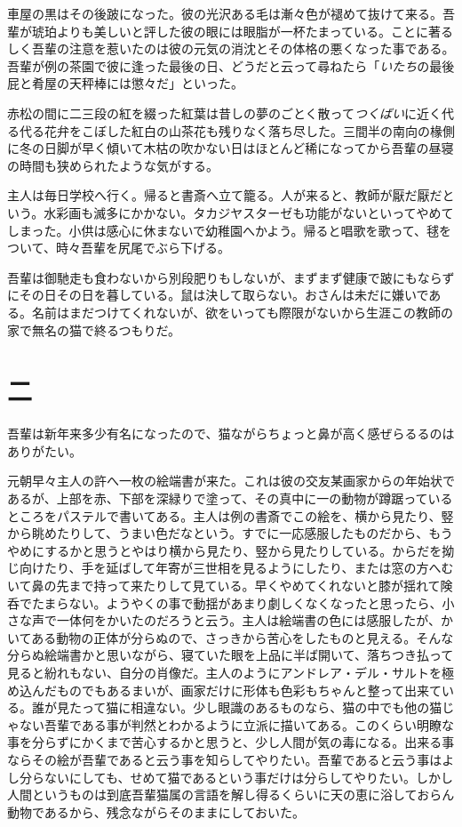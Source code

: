 \documentclass[12pt, openright]{book}
\begin{document}
車屋の黒はその後跛になった。彼の光沢ある毛は漸々色が褪めて抜けて来る。吾輩が琥珀よりも美しいと評した彼の眼には眼脂が一杯たまっている。ことに著るしく吾輩の注意を惹いたのは彼の元気の消沈とその体格の悪くなった事である。吾輩が例の茶園で彼に逢った最後の日、どうだと云って尋ねたら「\emph{いたち}の最後屁と肴屋の天秤棒には懲々だ」といった。

赤松の間に二三段の紅を綴った紅葉は昔しの夢のごとく散って\emph{つくばい}に近く代る代る花弁をこぼした紅白の山茶花も残りなく落ち尽した。三間半の南向の椽側に冬の日脚が早く傾いて木枯の吹かない日はほとんど稀になってから吾輩の昼寝の時間も狭められたような気がする。

主人は毎日学校へ行く。帰ると書斎へ立て籠る。人が来ると、教師が厭だ厭だという。水彩画も滅多にかかない。タカジヤスターゼも功能がないといってやめてしまった。小供は感心に休まないで幼稚園へかよう。帰ると唱歌を歌って、毬をついて、時々吾輩を尻尾でぶら下げる。

吾輩は御馳走も食わないから別段肥りもしないが、まずまず健康で跛にもならずにその日その日を暮している。鼠は決して取らない。おさんは未だに嫌いである。名前はまだつけてくれないが、欲をいっても際限がないから生涯この教師の家で無名の猫で終るつもりだ。

\chapter*{\centering 二}
吾輩は新年来多少有名になったので、猫ながらちょっと鼻が高く感ぜらるるのはありがたい。

元朝早々主人の許へ一枚の絵端書が来た。これは彼の交友某画家からの年始状であるが、上部を赤、下部を深緑りで塗って、その真中に一の動物が蹲踞っているところをパステルで書いてある。主人は例の書斎でこの絵を、横から見たり、竪から眺めたりして、うまい色だなという。すでに一応感服したものだから、もうやめにするかと思うとやはり横から見たり、竪から見たりしている。からだを拗じ向けたり、手を延ばして年寄が三世相を見るようにしたり、または窓の方へむいて鼻の先まで持って来たりして見ている。早くやめてくれないと膝が揺れて険呑でたまらない。ようやくの事で動揺があまり劇しくなくなったと思ったら、小さな声で一体何をかいたのだろうと云う。主人は絵端書の色には感服したが、かいてある動物の正体が分らぬので、さっきから苦心をしたものと見える。そんな分らぬ絵端書かと思いながら、寝ていた眼を上品に半ば開いて、落ちつき払って見ると紛れもない、自分の肖像だ。主人のようにアンドレア・デル・サルトを極め込んだものでもあるまいが、画家だけに形体も色彩もちゃんと整って出来ている。誰が見たって猫に相違ない。少し眼識のあるものなら、猫の中でも他の猫じゃない吾輩である事が判然とわかるように立派に描いてある。このくらい明瞭な事を分らずにかくまで苦心するかと思うと、少し人間が気の毒になる。出来る事ならその絵が吾輩であると云う事を知らしてやりたい。吾輩であると云う事はよし分らないにしても、せめて猫であるという事だけは分らしてやりたい。しかし人間というものは到底吾輩猫属の言語を解し得るくらいに天の恵に浴しておらん動物であるから、残念ながらそのままにしておいた。
\end{document}
